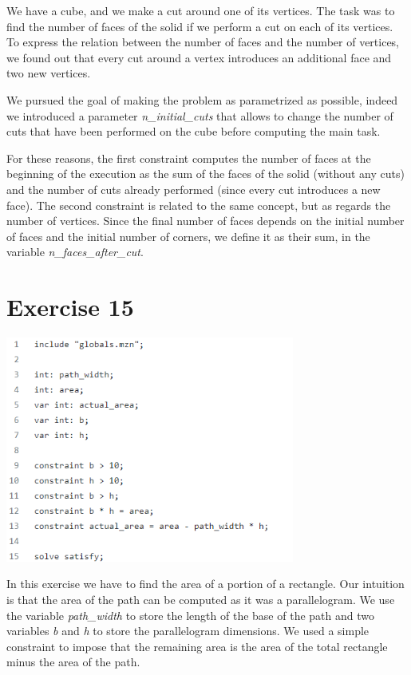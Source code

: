 \documentclass{article}
\begin{document}
We have a cube, and we make a cut around one of its vertices. The task was to find the number of faces of the solid if we perform a cut on 
each of its vertices. 
To express the relation between the number of faces and the number of vertices, we found out that every cut around a vertex introduces an additional
face and two new vertices.

We pursued the goal of making the problem as parametrized as possible, indeed we introduced a parameter \textit{n\_initial\_cuts}
that allows to change the number of cuts that have been performed on the cube before computing the main task.

For these reasons, the first constraint computes the number of faces at the beginning of the execution as 
the sum of the faces of the solid (without any cuts) and the number of cuts already performed (since every cut introduces a new face).
The second constraint is related to the same concept, but as regards the number of vertices.
Since the final number of faces depends on the initial number of faces and the initial number of corners,
we define it as their sum, in the variable \textit{n\_faces\_after\_cut}.

\section{Exercise 15}
\vspace{0.2cm}
\includegraphics[width=9.5cm]{img/Es15.png}
\vspace{0.2cm}

In this exercise we have to find the area of a portion of a rectangle. Our intuition is that the area of the path can be computed as it was a parallelogram. We use the variable \textit{path\_width} to store the length of the base of the path and two variables \textit{b} and \textit{h} to store the parallelogram dimensions. We used a simple constraint to impose that the remaining area is the area of the total rectangle minus the area of the path.
\end{document}
